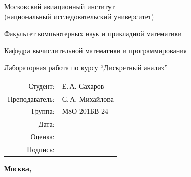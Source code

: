 \begin{titlepage}
\begin{center}
\bfseries

{\Large Московский авиационный институт\\ (национальный исследовательский университет)

}

\vspace{48pt}

{\large Факультет компьютерных наук и прикладной математики
}

\vspace{36pt}

{\large Кафедра вычислительной математики и программирования

}


\vspace{48pt}

Лабораторная работа  по курсу \enquote{Дискретный анализ}

\end{center}

\vspace{72pt}

\begin{flushright}
\begin{tabular}{rl}
Студент: & Е.\,А. Сахаров \\
Преподаватель: & С.\,А. Михайлова \\
Группа: & М8О-201БВ-24 \\
Дата: & \\
Оценка: & \\
Подпись: & \\
\end{tabular}
\end{flushright}

\vfill

\begin{center}
\bfseries
Москва, \the\year
\end{center}
\end{titlepage}

\pagebreak
